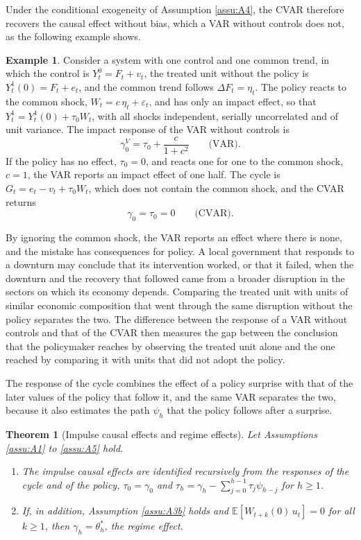 \documentclass[12pt,a4paper]{article}
\newtheorem{thm}{Theorem}
\theoremstyle{definition}
\theoremstyle{definition}\newtheorem{example}{Example}
\theoremstyle{definition}\newtheorem{definition}{Definition}
\newcommand{\E}{\mathbb{E}}
\begin{document}
Under the conditional exogeneity of Assumption \ref{assu:A4}, the CVAR therefore recovers the causal effect without bias, which a VAR without controls does not, as the following example shows.

\begin{example}
Consider a system with one control and one common trend, in which the control is $Y^0_t=F_t+v_t$, the treated unit without the policy is $Y^1_t(0)=F_t+e_t$, and the common trend follows $\Delta F_t=\eta_t$. The policy reacts to the common shock, $W_t=c\,\eta_t+\varepsilon_t$, and has only an impact effect, so that $Y^1_t=Y^1_t(0)+\tau_0W_t$, with all shocks independent, serially uncorrelated and of unit variance. The impact response of the VAR without controls is
\begin{equation*}
\gamma^V_0=\tau_0+\frac{c}{1+c^2}\qquad\text{(VAR)}.
\end{equation*}
If the policy has no effect, $\tau_0=0$, and reacts one for one to the common shock, $c=1$, the VAR reports an impact effect of one half. The cycle is $G_t=e_t-v_t+\tau_0W_t$, which does not contain the common shock, and the CVAR returns
\begin{equation*}
\gamma_0=\tau_0=0\qquad\text{(CVAR)}.
\end{equation*}
\end{example}

By ignoring the common shock, the VAR reports an effect where there is none, and the mistake has consequences for policy. A local government that responds to a downturn may conclude that its intervention worked, or that it failed, when the downturn and the recovery that followed came from a broader disruption in the sectors on which its economy depends. Comparing the treated unit with units of similar economic composition that went through the same disruption without the policy separates the two. The difference between the response of a VAR without controls and that of the CVAR then measures the gap between the conclusion that the policymaker reaches by observing the treated unit alone and the one reached by comparing it with units that did not adopt the policy.

The response of the cycle combines the effect of a policy surprise with that of the later values of the policy that follow it, and the same VAR separates the two, because it also estimates the path $\psi_h$ that the policy follows after a surprise.

\begin{thm}[Impulse causal effects and regime effects\label{thm:direct}]
Let Assumptions \ref{assu:A1} to \ref{assu:A5} hold.
\begin{enumerate}
\item[(a)] The impulse causal effects are identified recursively from the responses of the cycle and of the policy, $\tau_0=\gamma_0$ and $\tau_h=\gamma_h-\sum_{j=0}^{h-1}\tau_j\psi_{h-j}$ for $h\geq1$.
\item[(b)] If, in addition, Assumption \ref{assu:A3b} holds and $\E[W_{t+k}(0)\,u_t]=0$ for all $k\geq1$, then $\gamma_h=\theta^\ast_h$, the regime effect.
\end{enumerate}
\end{thm}
\end{document}
